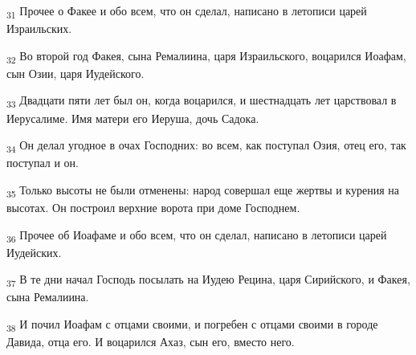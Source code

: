 \begin{tcolorbox}
\textsubscript{31} Прочее о Факее и обо всем, что он сделал, написано в летописи царей Израильских.
\end{tcolorbox}
\begin{tcolorbox}
\textsubscript{32} Во второй год Факея, сына Ремалиина, царя Израильского, воцарился Иоафам, сын Озии, царя Иудейского.
\end{tcolorbox}
\begin{tcolorbox}
\textsubscript{33} Двадцати пяти лет был он, когда воцарился, и шестнадцать лет царствовал в Иерусалиме. Имя матери его Иеруша, дочь Садока.
\end{tcolorbox}
\begin{tcolorbox}
\textsubscript{34} Он делал угодное в очах Господних: во всем, как поступал Озия, отец его, так поступал и он.
\end{tcolorbox}
\begin{tcolorbox}
\textsubscript{35} Только высоты не были отменены: народ совершал еще жертвы и курения на высотах. Он построил верхние ворота при доме Господнем.
\end{tcolorbox}
\begin{tcolorbox}
\textsubscript{36} Прочее об Иоафаме и обо всем, что он сделал, написано в летописи царей Иудейских.
\end{tcolorbox}
\begin{tcolorbox}
\textsubscript{37} В те дни начал Господь посылать на Иудею Рецина, царя Сирийского, и Факея, сына Ремалиина.
\end{tcolorbox}
\begin{tcolorbox}
\textsubscript{38} И почил Иоафам с отцами своими, и погребен с отцами своими в городе Давида, отца его. И воцарился Ахаз, сын его, вместо него.
\end{tcolorbox}
